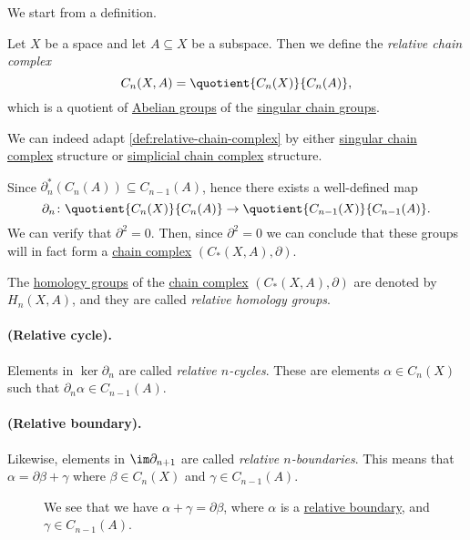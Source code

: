 We start from a definition.
\begin{definition}\label{def:relative-chain-complex}
	Let \(X\) be a space and let \(A \subseteq X\) be a subspace. Then we define the \emph{relative chain complex}
	\[
		C_n(X, A) = \quotient{C_n(X)}{C_n(A)},
	\]
	which is a quotient of \hyperref[def:Abelian-group]{Abelian groups} of the \hyperref[def:singular-chain]{singular chain groups}.
\end{definition}
\begin{remark}
	We can indeed adapt \autoref{def:relative-chain-complex} by either \hyperref[def:singular-chain]{singular chain complex}
	structure or \hyperref[def:simplicial-complex]{simplicial chain complex} structure.
\end{remark}

\begin{exercise}
	Since \(\partial^\ast_n(C_{n} (A))\subseteq C_{n-1}(A) \), hence there exists a well-defined map
	\[
		\partial_n\colon \quotient{C_{n} (X)}{C_{n} (A)} \to \quotient{C_{n-1} (X)}{C_{n-1}(A)}.
	\]
	We can verify that \(\partial^{2} =0\). Then, since \(\partial^2 = 0\) we can conclude that these groups will in fact form a
	\hyperref[def:chain-complex]{chain complex} \((C_\ast(X, A), \partial)\).
\end{exercise}

\begin{definition}\label{def:relative-homology}
	The \hyperref[def:homology-group]{homology groups} of the \hyperref[def:chain-complex]{chain complex} \((C_\ast(X, A), \partial)\) are denoted
	by \(H_n(X, A)\), and they are called \emph{relative homology groups}.

	\paragraph{(Relative cycle).}\label{def:relative-cycle}
	Elements in \(\ker \partial_n\) are called \emph{relative \(n\)-cycles}. These are elements
	\(\alpha \in C_n(X)\) such that \(\partial_n\alpha \in C_{n - 1}(A)\).
	\begin{figure}[H]
		\centering
		\label{fig:def:relative-homology-1}
	\end{figure}

	\paragraph{(Relative boundary).}\label{def:relative-boundary}
	Likewise, elements in \(\im \partial_{n + 1}\) are called \emph{relative \(n\)-boundaries}.
	This means that \(\alpha = \partial \beta + \gamma\) where \(\beta \in C_n(X)\) and \(\gamma \in C_{n - 1}(A)\).
	\begin{figure}[H]
		\centering
		\caption{We see that we have \(\alpha +\gamma =\partial \beta \), where \(\alpha \) is a \hyperref[def:relative-boundary]{relative boundary},
			and \(\gamma \in C_{n-1}(A)\).}
		\label{fig:def:relative-homology-2}
	\end{figure}
\end{definition}

